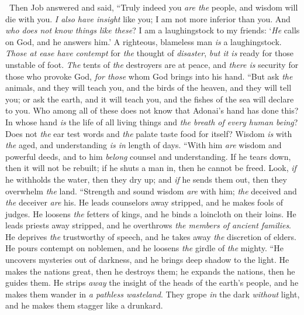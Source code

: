 \begin{biblechapter} %
  Then Job answered and said,
\verse “Truly indeed you \textit{are the} people, 
and wisdom will die with you.
\verse \textit{I also have insight} like you; 
I am not more inferior than you. 
And \textit{who does not know things like these}?
\verse I am a laughingstock to my friends: 
‘\textit{He} calls on God, and he answers him.’ 
A righteous, blameless man \textit{is} a laughingstock.
\verse \textit{Those at ease have contempt} for \textit{the} thought of \textit{disaster}, 
\textit{but it is} ready for those unstable of foot.
\verse \textit{The} tents of \textit{the} destroyers are at peace, 
and \textit{there is} security for those who provoke God, 
\textit{for those} whom God brings into his hand.
\verse “But ask \textit{the} animals, and they will teach you, 
and the birds of the heaven, and they will tell you;
\verse or ask the earth, and it will teach you, 
and the fishes of the sea will declare to you.
\verse Who among all of these does not know 
that Adonai’s hand has done this?
\verse In whose hand \textit{is} the life of all living things 
and \textit{the breath of every human being}?
\verse Does not \textit{the} ear test words 
and \textit{the} palate taste food for itself?
\verse Wisdom \textit{is} with \textit{the} aged, 
and understanding \textit{is in} length of days.
\verse “With him \textit{are} wisdom and powerful deeds, 
and to him \textit{belong} counsel and understanding.
\verse If he tears down, then it will not be rebuilt; 
if he shuts a man in, then he cannot be freed.
\verse Look, \textit{if} he withholds the water, then they dry up; 
and \textit{if} he sends them out, then they overwhelm \textit{the} land.
\verse “Strength and sound wisdom \textit{are} with him; 
\textit{the} deceived and \textit{the} deceiver \textit{are} his.
\verse He leads counselors away stripped, 
and he makes fools of judges.
\verse He loosens \textit{the} fetters of kings, 
and he binds a loincloth on their loins.
\verse He leads priests away stripped, 
and he overthrows \textit{the members of ancient families}.
\verse He deprives \textit{the} trustworthy of speech, 
and he takes away \textit{the} discretion of elders.
\verse He pours contempt on noblemen, 
and he loosens \textit{the} girdle of \textit{the} mighty.
\verse “He uncovers mysteries out of darkness, 
and he brings deep shadow to the light.
\verse He makes the nations great, then he destroys them; 
he expands the nations, then he guides them.
\verse He strips \textit{away} the insight of the heads of the earth’s people, 
and he makes them wander in \textit{a pathless wasteland}.
\verse They grope \textit{in} the dark \textit{without} light, 
and he makes them stagger like a drunkard.
\end{biblechapter}

